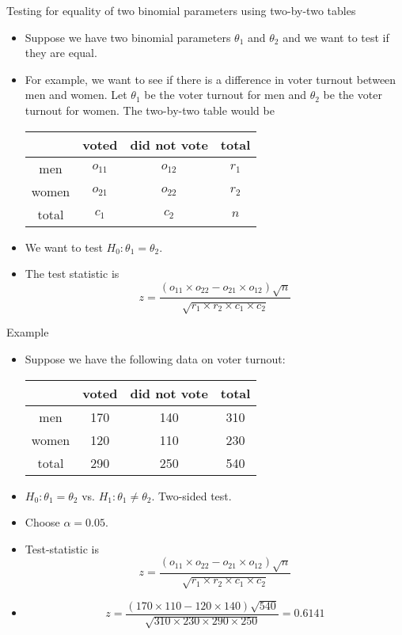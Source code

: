 \documentclass[10pt, xcolor=table]{beamer}
\newcommand*\themecol{\usebeamercolor[fg]{structure}}
\begin{document}
\begin{frame}{Testing for equality of two binomial parameters using two-by-two tables}
\begin{itemize}\itemsep2ex
\item Suppose we have two binomial parameters $\theta_1$ and $\theta_2$ and we want to test if they are equal.
\item For example, we want to see if there is a difference in voter turnout between men and women. Let $\theta_1$ be the voter turnout for men and $\theta_2$ be the voter turnout for women. The two-by-two table would be
\medskip
{\footnotesize
\begin{table}[]
\begin{tabular}{|c|cc|c|}
\hline
      & voted & did not vote & total \\ \hline
men   & $o_{11}$ & $o_{12}$        & $r_1$  \\ 
women & $o_{21}$ & $o_{22}$        & $r_2$  \\ \hline
total & $c_1$  & $c_2$         & $n$     \\ \hline
\end{tabular}
\end{table}
}
\item We want to test $H_0: \theta_1 = \theta_2$.
\item The test statistic is
{\themecol
\[
z = \frac{(o_{11} \times o_{22} - o_{21} \times o_{12})\sqrt{n}}{\sqrt{r_1 \times r_2 \times c_1 \times c_2}}
\]
}
\end{itemize}
\end{frame}

\begin{frame}{Example}
\begin{itemize}
\setlength{\itemsep}{8pt}
\item Suppose we have the following data on voter turnout:
\medskip
{\footnotesize
\begin{table}[]
\begin{tabular}{|c|cc|c|}
\hline
      & voted & did not vote & total \\ \hline
men   & 170 & 140       & 310  \\ 
women & 120 & 110        & 230  \\ \hline
total & 290  & 250        & 540     \\ \hline
\end{tabular}
\end{table}
}
\item<1->[Step 1] $H_0: \theta_1 = \theta_2$ vs. $H_1: \theta_1 \neq \theta_2$. Two-sided test. 
\item<2->[Step 2] Choose $\alpha = 0.05$. 
\item<3->[Step 3] Test-statistic is 
{\small
\[
z = \frac{(o_{11} \times o_{22} - o_{21} \times o_{12})\sqrt{n}}{\sqrt{r_1 \times r_2 \times c_1 \times c_2}}
\]
}
\item<4->[]
{\small
\[
z = \frac{(170 \times 110 - 120 \times 140)\sqrt{540}}{\sqrt{310 \times 230 \times 290 \times 250}} = 0.6141
\]
}
\end{itemize}
\end{frame}
\end{document}
